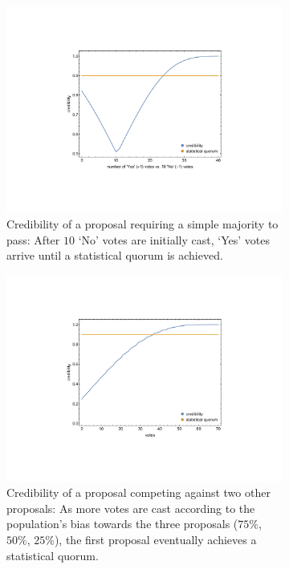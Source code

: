 \documentclass[format=acmsmall, review=true, screen=true, anonymous=true]{acmart}
\begin{document}
\begin{figure}[ht]
\centering
\begin{subfigure}[t]{.5\textwidth}
\centering
\includegraphics[width=\textwidth]{figures/simple_majority.pdf}
\caption{Credibility of a proposal requiring a simple majority to pass: After $10$ `No' votes are initially cast, `Yes' votes arrive until a statistical quorum is achieved.}
\label{fig:simple_majority}
\end{subfigure}%
\begin{subfigure}[t]{.5\textwidth}
\centering
\includegraphics[width=\textwidth]{figures/competing_proposals.pdf}
\caption{Credibility of a proposal competing against two other proposals: As more votes are cast according to the population's bias towards the three proposals ($75\%$, $50\%$, $25\%$), the first proposal eventually achieves a statistical quorum.}
\label{fig:competing_proposals}
\end{subfigure}
\caption{}
\end{figure}
\end{document}
